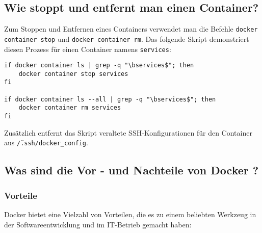 \subsection{Wie stoppt und entfernt man einen Container?}

Zum Stoppen und Entfernen eines Containers verwendet man die Befehle \texttt{docker container stop} und \texttt{docker container rm}. Das folgende Skript demonstriert diesen Prozess für einen Container namens \texttt{services}:

\begin{verbatim}
if docker container ls | grep -q "\bservices$"; then
    docker container stop services
fi

if docker container ls --all | grep -q "\bservices$"; then
    docker container rm services
fi
\end{verbatim}

Zusätzlich entfernt das Skript veraltete SSH-Konfigurationen für den Container aus \texttt{\~/.ssh/docker\_config}.

\subsection{Was sind die Vor - und Nachteile von Docker ? }

\subsubsection{Vorteile}

Docker bietet eine Vielzahl von Vorteilen, die es zu einem beliebten Werkzeug in der Softwareentwicklung und im IT-Betrieb gemacht haben:


